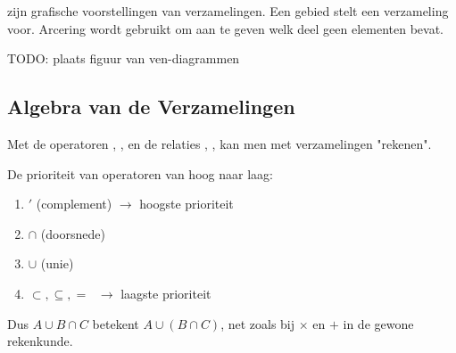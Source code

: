  zijn grafische voorstellingen van verzamelingen. Een gebied stelt een verzameling voor. Arcering wordt gebruikt om aan te geven welk deel geen elementen bevat.

\colorbox{magenta!66}{TODO: plaats figuur van ven-diagrammen}

\subsection{Algebra van de Verzamelingen}

Met de operatoren \inlinetext{$\cup$}, \inlinetext{$\cap$},  en de relaties \inlinetext{$\subseteq$}, \inlinetext{$\subset$}, \inlinetext{$=$} kan men met verzamelingen "rekenen".


De prioriteit van operatoren van hoog naar laag:
\begin{enumerate}
    \item $'$ (complement) $\rightarrow$ hoogste prioriteit
    \item $\cap$ (doorsnede)
    \item $\cup$ (unie)
    \item $\subset, \subseteq, =$ $\;\rightarrow$ laagste prioriteit
\end{enumerate}

Dus $A \cup B \cap C$ betekent $A \cup (B \cap C)$, net zoals bij $\times$ en $+$ in de gewone rekenkunde.


